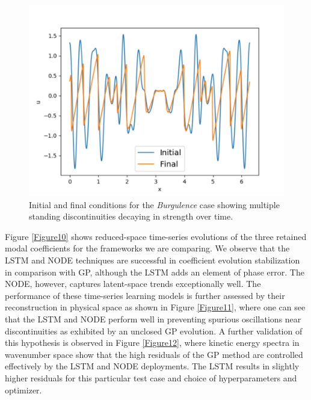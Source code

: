 \documentclass[preprint,12pt]{elsarticle}
\begin{document}
\begin{figure}
	\centering
	\includegraphics[width=\textwidth]{Figure_12.pdf}
	\caption{Initial and final conditions for the \emph{Burgulence} case showing multiple standing discontinuities decaying in strength over time.}
	\label{Figure9}
\end{figure}

Figure \ref{Figure10} shows reduced-space time-series evolutions of the three retained modal coefficients for the frameworks we are comparing. We observe that the LSTM and NODE techniques are successful in coefficient evolution stabilization in comparison with GP, although the LSTM adds an element of phase error. The NODE, however, captures latent-space trends exceptionally well. The performance of these time-series learning models is further assessed by their reconstruction in physical space as shown in Figure \ref{Figure11}, where one can  see that the LSTM and NODE perform well in preventing spurious oscillations near discontinuities as exhibited by an unclosed GP evolution. A further validation of this hypothesis is observed in Figure \ref{Figure12}, where kinetic energy spectra in wavenumber space show that the high residuals of the GP method are controlled effectively by the LSTM and NODE deployments. The LSTM  results in slightly higher residuals for this particular test case and choice of hyperparameters and optimizer.
\end{document}
